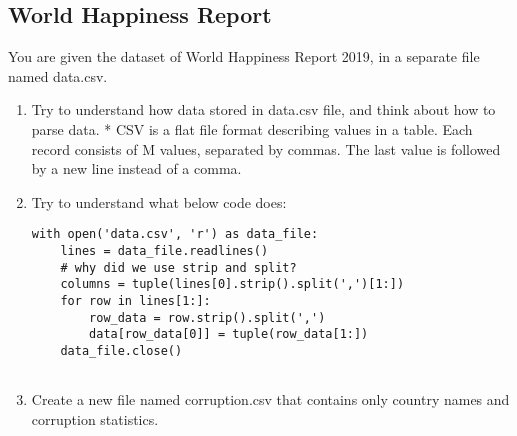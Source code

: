 \documentclass[a4paper]{article}
\begin{document}
\subsection{World Happiness Report}
You are given the dataset of World Happiness Report 2019, in a separate file named data.csv.
\begin{enumerate}
    \item Try to understand how data stored in data.csv file, and think about how to parse data. \newline
        * CSV is a flat file format describing values in a table. Each record consists of M values, separated by commas. The last value is followed by a new line instead of a comma.
    \item Try to understand what below code does:
    \begin{lstlisting}
with open('data.csv', 'r') as data_file:
    lines = data_file.readlines()
    # why did we use strip and split?
    columns = tuple(lines[0].strip().split(',')[1:])
    for row in lines[1:]:
        row_data = row.strip().split(',')
        data[row_data[0]] = tuple(row_data[1:])
    data_file.close()
    
\end{lstlisting}
\item Create a new file named corruption.csv that contains only country names and corruption statistics.
\end{enumerate}
\end{document}
